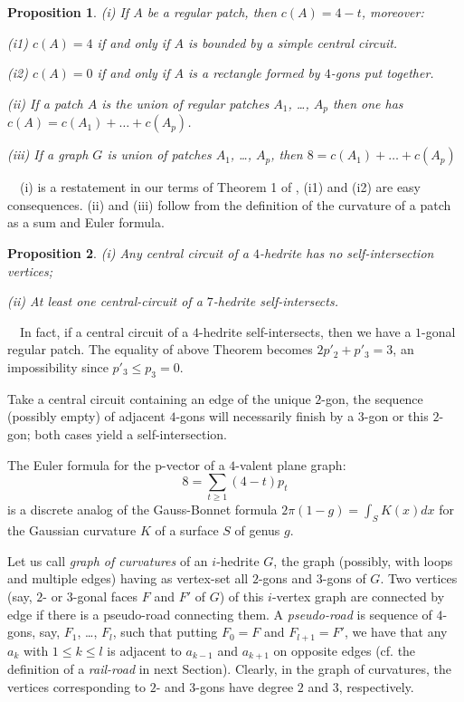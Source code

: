 \documentclass[12pt]{article}
\newtheorem{proposition}{Proposition}
\newcommand{\proof}{\noindent{\bf Proof.}\ \ }
\begin{document}
\begin{proposition}\label{Local-Euler-Formula}
(i) If $A$ be a regular patch, then $c(A)=4-t$, moreover:

(i1) $c(A)=4$ if and only if $A$ is bounded by a simple central circuit.

(i2) $c(A)=0$ if and only if $A$ is a rectangle formed by $4$-gons put 
together.

(ii) If a patch $A$ is the union of regular patches $A_1$, \dots, $A_p$ then one has $c(A)=c(A_1)+\dots+c(A_p)$.

(iii) If a graph $G$ is union of patches $A_1$, \dots, $A_p$, then $8=c(A_1)+\dots+c(A_p)$
\end{proposition}
\proof (i) is a restatement in our terms of Theorem 1 of \cite{DSt}, (i1) and (i2) are easy consequences. (ii) and (iii) follow from the definition of the curvature of a patch as a sum and Euler formula.






\begin{proposition}
(i) Any central circuit of a $4$-hedrite has no self-intersection vertices;

(ii) At least one central-circuit of a $7$-hedrite self-intersects.
\end{proposition}
\proof In fact, if a central circuit of a $4$-hedrite self-intersects, then we have a $1$-gonal regular patch. The equality of above Theorem becomes $2p'_2+p'_3=3$, an impossibility since $p'_3\leq p_3=0$.

Take a central circuit containing an edge of the unique $2$-gon, the sequence (possibly empty) of adjacent $4$-gons will necessarily finish by a $3$-gon or this $2$-gon; both cases yield a self-intersection.






The Euler formula for the p-vector of a $4$-valent plane graph:
$$8=\sum_{t\geq 1} (4-t)p_t$$
is a discrete analog of the Gauss-Bonnet formula $2\pi(1-g)=\int_{S} K(x)dx$ for the Gaussian curvature $K$ of a surface $S$ of genus $g$. 

Let us call {\em graph of curvatures} of an $i$-hedrite $G$, the
graph (possibly, with loops and multiple edges) having as vertex-set
all $2$-gons and $3$-gons of $G$. 
Two vertices (say, $2$- or $3$-gonal faces $F$ and $F'$ of $G$) of 
this $i$-vertex graph are connected by edge if there is a pseudo-road 
connecting them. A {\em pseudo-road} is sequence of $4$-gons, say,
$F_1$, \dots, $F_l$, such that putting $F_0=F$ and $F_{l+1}=F'$, 
we have that any $a_k$ with $1\leq k\leq l$ is adjacent to $a_{k-1}$ 
and $a_{k+1}$ on opposite edges (cf. the definition of
a {\em rail-road} in next Section). Clearly, in the graph of curvatures, 
the vertices corresponding to $2$- and $3$-gons have degree $2$ and $3$, 
respectively.
\end{document}
